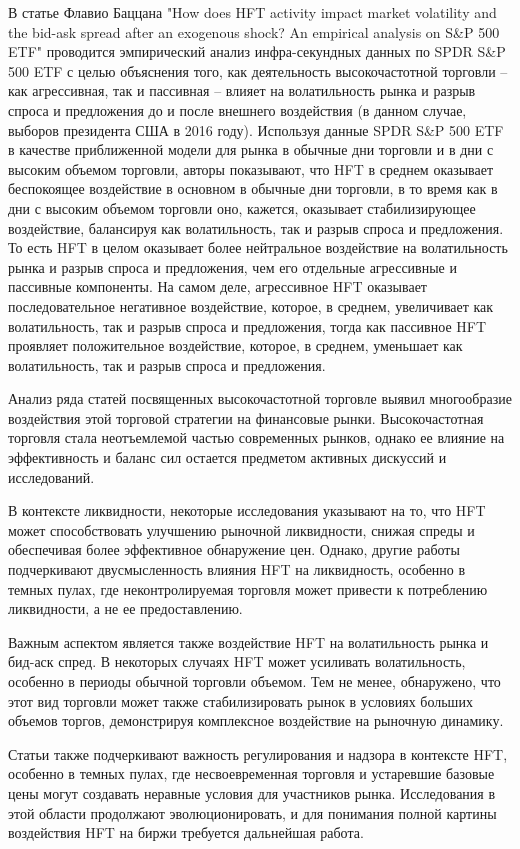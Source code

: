 \documentclass{letask}
\begin{document}
В статье Флавио Баццана "How does HFT activity impact market volatility and the bid-ask spread after an exogenous shock? An empirical analysis on S\&P 500 ETF" проводится эмпирический анализ инфра-секундных данных по SPDR S\&P 500 ETF с целью объяснения того, как деятельность высокочастотной торговли – как агрессивная, так и пассивная – влияет на волатильность рынка и разрыв спроса и предложения до и после внешнего воздействия (в данном случае, выборов президента США в 2016 году). Используя данные SPDR S\&P 500 ETF в качестве приближенной модели для рынка в обычные дни торговли и в дни с высоким объемом торговли, авторы показывают, что HFT в среднем оказывает беспокоящее воздействие в основном в обычные дни торговли, в то время как в дни с высоким объемом торговли оно, кажется, оказывает стабилизирующее воздействие, балансируя как волатильность, так и разрыв спроса и предложения. То есть HFT в целом оказывает более нейтральное воздействие на волатильность рынка и разрыв спроса и предложения, чем его отдельные агрессивные и пассивные компоненты. На самом деле, агрессивное HFT оказывает последовательное негативное воздействие, которое, в среднем, увеличивает как волатильность, так и разрыв спроса и предложения, тогда как пассивное HFT проявляет положительное воздействие, которое, в среднем, уменьшает как волатильность, так и разрыв спроса и предложения.

Анализ ряда статей посвященных высокочастотной торговле выявил многообразие воздействия этой торговой стратегии на финансовые рынки. Высокочастотная торговля стала неотъемлемой частью современных рынков, однако ее влияние на эффективность и баланс сил остается предметом активных дискуссий и исследований.

В контексте ликвидности, некоторые исследования указывают на то, что HFT может способствовать улучшению рыночной ликвидности, снижая спреды и обеспечивая более эффективное обнаружение цен. Однако, другие работы подчеркивают двусмысленность влияния HFT на ликвидность, особенно в темных пулах, где неконтролируемая торговля может привести к потреблению ликвидности, а не ее предоставлению.

Важным аспектом является также воздействие HFT на волатильность рынка и бид-аск спред. В некоторых случаях HFT может усиливать волатильность, особенно в периоды обычной торговли объемом. Тем не менее, обнаружено, что этот вид торговли может также стабилизировать рынок в условиях больших объемов торгов, демонстрируя комплексное воздействие на рыночную динамику.

Статьи также подчеркивают важность регулирования и надзора в контексте HFT, особенно в темных пулах, где несвоевременная торговля и устаревшие базовые цены могут создавать неравные условия для участников рынка. Исследования в этой области продолжают эволюционировать, и для понимания полной картины воздействия HFT на биржи требуется дальнейшая работа.
\end{document}
